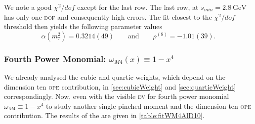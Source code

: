 \documentclass[../../index.tex]{subfiles}
\begin{document}
We note a good \(\chi^2/dof\) except for the last row. The last row, at
\(s_{min}=\SI{2.8}{\giga\eV}\) has only one \textsc{dof} and consequently high
errors. The fit closest to the \(\chi^2/dof\) threshold then yields the
following parameter values
\begin{equation}
  \alpha(m_\tau^2) = 0.3214(49) \qquad \text{and} \qquad \rho^{(8)}=-1.01(39).
\end{equation}


\subsubsection{Fourth Power Monomial: \(\omega_{M4}(x) \equiv 1-x^4\)}
We already analysed the cubic and quartic weights, which depend on the dimension
ten \textsc{ope} contribution, in \cref{sec:cubicWeight} and
\cref{sec:quarticWeight} correspondingly. Now, even with the visible \textsc{dv}
for fourth power monomial \(\omega_{M4}\equiv 1-x^4\) to study another single
pinched moment and the dimension ten \textsc{ope} contribution. The results of
the are given in \cref{table:fitWM4AlD10}.
\end{document}
